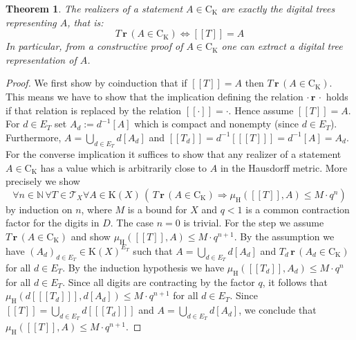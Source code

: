 \documentclass[microtype]{jloganal}
\theoremstyle{plain}
\newtheorem{theorem}{Theorem}[section]
\theoremstyle{definition}
\newcommand{\NN}{\mathbb{N}}
\newcommand{\TTT}{\mathcal{T}}
\newcommand{\coco}{\mathrm{C}}
\newcommand{\compact}{\mathrm{K}}
\newcommand{\hdm}{\mu_{\mathrm H}}
\newcommand{\val}[1]{[\![#1]\!]}
\newcommand{\rea}[2]{#1\,\mathbf{r}\,#2}
\newcommand{\branches}[1]{E_{#1}}
\newcommand{\subtree}[2]{#1_{#2}}
\begin{document}
\begin{theorem}
\label{thm-coco-compact-real}
The realizers of a statement $A\in\coco_{\compact}$ are exactly the 
digital trees representing $A$, that is: 
\[\rea{T}{(A\in\coco_{\compact})} \Longleftrightarrow \val{T}=A \]
In particular, from a constructive proof of $A\in\coco_{\compact}$ one 
can extract a digital tree representation of $A$.
\end{theorem}
\begin{proof}
We first show by coinduction that if $\val{T}=A$ then 
$\rea{T}{(A\in\coco_{\compact})}$.
This means we have to show that the implication defining 
the relation $\rea{\cdot}{\cdot}$ holds if that relation
is replaced by the relation $\val{\cdot} = \cdot$.
Hence assume $\val{T} = A$. 
For $d\in \branches{T}$ set 
$A_d := d^{-1}[A]$ which is compact and nonempty (since $d\in \branches{T}$).
Furthermore, $A = \bigcup_{d\in \branches{T}} d[A_d]$ and
$\val{\subtree{T}{d}} = d^{-1}[\val{T}] = d^{-1}[A] = A_d$.
For the converse implication it suffices to show that any realizer
of a statement $A\in\coco_{\compact}$ has a value which is arbitrarily 
close to $A$ in the Hausdorff metric. More precisely we show
\[\forall n\in\NN\,\forall T\in\TTT_X\forall A\in\compact(X)\,(\,
    \rea{T}{(A\in\coco_{\compact})} \Rightarrow \hdm(\val{T},A)\le M\cdot 
q^{n})\]
by induction on $n$, where $M$ is a bound for $X$ and $q<1$ is a common 
contraction factor for the digits in $D$. 
The case $n=0$ is trivial. 
For the step we assume $\rea{T}{(A\in\coco_{\compact})}$ and show 
$\hdm(\val{T},A)\le M\cdot q^{n+1}$.
By the assumption we have 
$(A_d)_{d\in \branches{T}} \in \compact(X)^{\branches{T}}$ such that
$A = \bigcup_{d\in \branches{T}} d[A_d]$ and 
$\rea{\subtree{T}{d}}{(A_d\in\coco_{\compact})}$ for all $d\in\branches{T}$.
By the induction hypothesis we have 
$\hdm(\val{\subtree{T}{d}},A_d)\le M\cdot q^{n}$ for all $d\in\branches{T}$.
Since all digits are contracting by the factor $q$, it follows that
$\hdm(d[\val{\subtree{T}{d}}],d[A_d])\le M\cdot q^{n+1}$ for all 
$d\in\branches{T}$. 
Since $\val{T} = \bigcup_{d\in \branches{T}}d[\val{\subtree{T}{d}}]$ and
$A = \bigcup_{d\in \branches{T}} d[A_d]$, we conclude that
$\hdm(\val{T},A)\le M\cdot q^{n+1}$.
\end{proof}
\end{document}
